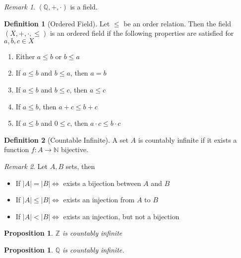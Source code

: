 \documentclass{article}
\newenvironment{enumrom}{\begin{enumerate}[label=(\roman*)]}{\end{enumerate}}
\newcommand{\fToN}[2]{#1 : #2 \rightarrow \mathbb{N}}
\theoremstyle{definition}
\newtheorem{definition}{Definition}[section]
\theoremstyle{definition}
\theoremstyle{plain}
\theoremstyle{plain}
\theoremstyle{plain}
\theoremstyle{plain}
\newtheorem{proposition}[theorem]{Proposition}
\theoremstyle{definition}
\theoremstyle{remark}
\theoremstyle{remark}
\theoremstyle{remark}
\theoremstyle{remark}
\newtheorem*{remark}{Remark}
\newcommand{\Z}{\mathbb{Z}}
\newcommand{\Q}{\mathbb{Q}}
\begin{document}
\begin{remark}
  $(\Q, +, \cdot)$ is a field.
\end{remark}


\begin{definition}[Ordered Field]
  Let $\leq$ be an order relation. Then the field $(X, +, \cdot, \leq)$ is an ordered field if the following properties are satisfied for $a, b, c\in X$
  \begin{enumrom}
  \item Either $a \leq b$ or $b \leq a$
  \item If $a \leq b$ and $b \leq a$, then $a = b$
  \item If $a \leq b$ and $b \leq c$, then $a \leq c$
  \item If $a \leq b$, then $a + c \leq b + c$
  \item If $a \leq b$ and $0 \leq c$, then $a \cdot c \leq b \cdot c$
  \end{enumrom}
\end{definition}




\begin{definition}[Countable Infinite]
  A set $A$ is countably infinite if it exists a function $\fToN{f}{A}$ bijective.
\end{definition}

\begin{remark}
  Let $A, B$ sets, then
  \begin{itemize}
  \item If $|A| = |B| \iff$ exists a bijection between $A$ and $B$
  \item If $|A| \leq |B| \iff$ exists an injection from $A$ to $B$
  \item If $|A| < |B| \iff$ exists an injection, but not a bijection
  \end{itemize}
\end{remark}


\begin{proposition}
  $\Z$ is countably infinite
\end{proposition}



\begin{proposition}
  $\Q$ is countably infinite.
\end{proposition}
\end{document}
